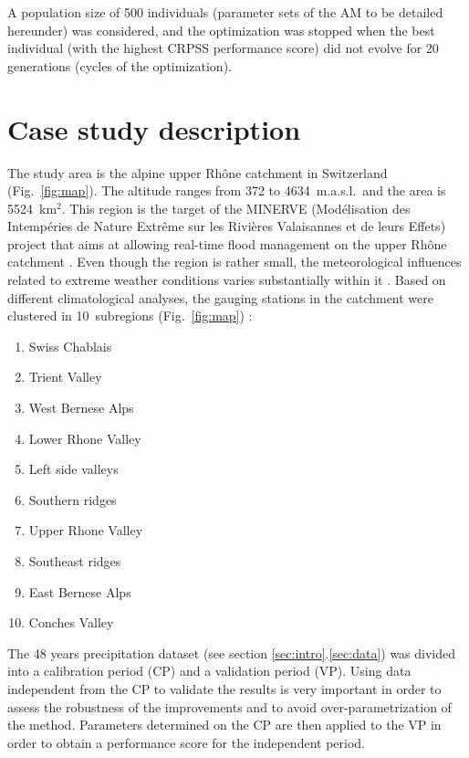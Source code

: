 \documentclass[review]{elsarticle}
\begin{document}
A population size of 500 individuals (parameter sets of the AM to be detailed hereunder) was considered, and the optimization was stopped when the best individual (with the highest CRPSS performance score) did not evolve for 20 generations (cycles of the optimization).


\section{Case study description}
\label{sec:case_study}

The study area is the alpine upper Rh\^{o}ne catchment in Switzerland (Fig.\ \ref{fig:map}). The altitude ranges from 372 to 4634~m.a.s.l.\ and the area is 5524~km$^{2}$. This region is the target of the MINERVE (Mod\'{e}lisation des Intemp\'{e}ries de Nature Extr\^{e}me sur les Rivi\`{e}res Valaisannes et de leurs Effets) project that aims at allowing real-time flood management on the upper Rh\^{o}ne catchment \citep{GarciaHernandez2009b}. Even though the region is rather small, the meteorological influences related to extreme weather conditions varies substantially within it \citep[see][]{Horton2012}. Based on different climatological analyses, the gauging stations in the catchment were clustered in 10~subregions (Fig.\ \ref{fig:map}) :

\begin{enumerate}
	\item Swiss Chablais
	\item Trient Valley
	\item West Bernese Alps
	\item Lower Rhone Valley
	\item Left side valleys
	\item Southern ridges
	\item Upper Rhone Valley
	\item Southeast ridges
	\item East Bernese Alps
	\item Conches Valley
\end{enumerate}

The 48 years precipitation dataset (see section \ref{sec:intro}.\ref{sec:data}) was divided into a calibration period (CP) and a validation period (VP). Using data independent from the CP to validate the results is very important in order to assess the robustness of the improvements and to avoid over-parametrization of the method. Parameters determined on the CP are then applied to the VP in order to obtain a performance score for the independent period.
\end{document}
